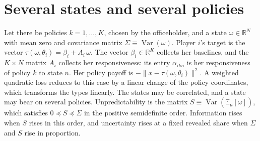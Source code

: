 \documentclass[12pt,letterpaper]{article}
\begin{document}
\section{Several states and several policies}\label{app:multi}

Let there be policies $k=1,\dots,K$, chosen by the officeholder, and a state $\omega\in\mathbb{R}^N$ with mean zero and covariance matrix $\Sigma\equiv\operatorname{Var}(\omega)$. Player $i$'s target is the vector $\tau(\omega,\theta_i)=\beta_i+A_i\,\omega$. The vector $\beta_i\in\mathbb{R}^K$ collects her baselines, and the $K\times N$ matrix $A_i$ collects her responsiveness: its entry $\alpha_{ikn}$ is her responsiveness of policy $k$ to state $n$. Her policy payoff is $-\|x-\tau(\omega,\theta_i)\|^2$. A weighted quadratic loss reduces to this case by a linear change of the policy coordinates, which transforms the types linearly. The states may be correlated, and a state may bear on several policies. Unpredictability is the matrix $S\equiv\operatorname{Var}(\mathbb{E}_\mu[\omega])$, which satisfies $0\preceq S\preceq\Sigma$ in the positive semidefinite order. Information rises when $S$ rises in this order, and uncertainty rises at a fixed revealed share when $\Sigma$ and $S$ rise in proportion.
\end{document}
